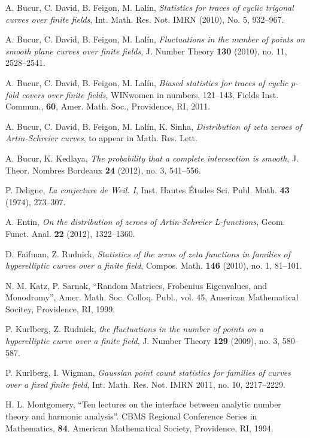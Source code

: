 \documentclass[12pt]{amsart}
\theoremstyle{plain}
\begin{document}
\begin{thebibliography}{99}

 A. Bucur, C. David, B. Feigon, M. Lal\'in, \emph{Statistics for traces of cyclic trigonal curves over finite fields}, Int. Math. Res. Not. IMRN (2010), No. 5, 932--967.

 A. Bucur, C. David, B. Feigon, M. Lal\'in, \emph{Fluctuations in the number of points on smooth plane curves over finite fields}, J. Number Theory {\bf 130} (2010), no. 11, 2528--2541.

 A. Bucur, C. David, B. Feigon, M. Lal\'in, \emph{Biased statistics for traces of cyclic $p$-fold covers over finite fields}, WINwomen in numbers, 121--143, Fields Inst. Commun., {\bf 60}, Amer. Math. Soc., Providence, RI, 2011.

 A. Bucur, C. David, B. Feigon, M. Lal\'in, K. Sinha, \emph{Distribution of zeta zeroes of Artin-Schreier curves}, to appear in Math. Res. Lett.

 A. Bucur, K. Kedlaya, \emph{The probability that a complete intersection is smooth}, J. Theor. Nombres Bordeaux {\bf 24} (2012), no. 3, 541--556.

 P. Deligne, \emph{La conjecture de Weil. I}, Inst. Hautes \'{E}tudes Sci. Publ. Math. {\bf 43} (1974), 273--307.

 A. Entin, \emph{On the distribution of zeroes of Artin-Schreier L-functions}, Geom. Funct. Anal. {\bf 22} (2012), 1322--1360.

 D. Faifman, Z. Rudnick, \emph{Statistics of the zeros of zeta functions in families of hyperelliptic curves over a finite field}, Compos. Math. {\bf 146} (2010), no. 1, 81--101.

 N. M. Katz, P. Sarnak, ``Random Matrices, Frobenius Eigenvalues, and Monodromy'', Amer. Math. Soc. Colloq. Publ., vol. 45, American Mathematical Socitey, Providence, RI, 1999.

 P. Kurlberg, Z. Rudnick, \emph{the fluctuations in the number of points on a hyperelliptic curve over a finite field}, J. Number Theory {\bf 129} (2009), no. 3, 580--587.

 P. Kurlberg, I. Wigman, \emph{Gaussian point count statistics for families of curves over a fixed finite field}, Int. Math. Res. Not. IMRN 2011, no. 10, 2217--2229.

 H. L. Montgomery, ``Ten lectures on the interface between analytic number theory and harmonic analysis''. CBMS Regional Conference Series in Mathematics, {\bf 84}. American Mathematical Society, Providence, RI, 1994.


\end{thebibliography}
\end{document}
